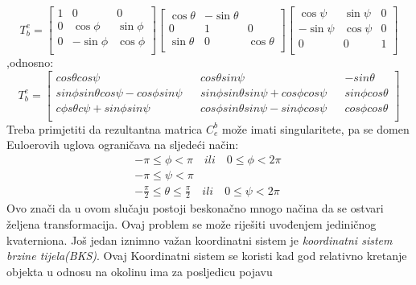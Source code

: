 \begin{equation}    
    T_b^e=\begin{bmatrix}
        1&0&0\\
        0&\cos\phi & \sin\phi \\
        0 & -\sin\phi & \cos\phi \\
    \end{bmatrix}    
    \begin{bmatrix}
        \cos\theta&-\sin\theta&\\
        0&1 & 0 \\
        \sin\theta & 0 & \cos\theta \\
    \end{bmatrix}
    \begin{bmatrix}
        \cos\psi & \sin\psi & 0\\
        -\sin\psi & \cos\psi &0\\
        0&0&1\\
    \end{bmatrix}
\end{equation}
,odnosno:
\begin{equation}
    T_b^e=\begin{bmatrix}
        cos\theta cos\psi && cos\theta sin\psi && -sin\theta\\
        sin\phi sin\theta cos\psi-cos\phi sin\psi && sin\phi sin\theta sin\psi +cos\phi cos\psi&& sin\phi cos\theta\\
        c\phi s\theta c\psi+sin\phi sin\psi && cos\phi sin\theta sin\psi -sin\phi cos\psi&& cos\phi cos\theta\\
    \end{bmatrix}
\end{equation}
Treba primjetiti da rezultantna matrica $C_e^b$ može imati singularitete, pa se domen
Euloerovih uglova ograničava na sljedeći način:
\begin{align*}
    -\pi \leq \phi <\pi \quad ili \quad 0\leq\phi<2\pi \\
    -\pi \leq \psi <\pi \qquad \qquad \qquad \qquad \\
    -\frac{\pi}{2}\leq \theta \leq \frac{\pi}{2} \quad ili \quad 0\leq\psi<2\pi
\end{align*}
Ovo znači da u ovom slučaju postoji beskonačno mnogo načina da se ostvari željena transformacija.
Ovaj problem se može riješiti uvođenjem jediničnog kvaterniona.
Još jedan iznimno važan koordinatni sistem je \textit{koordinatni sistem brzine tijela(BKS)}. Ovaj Koordinatni
sistem se koristi kad god relativno kretanje objekta u odnosu na okolinu ima za posljedicu pojavu 

